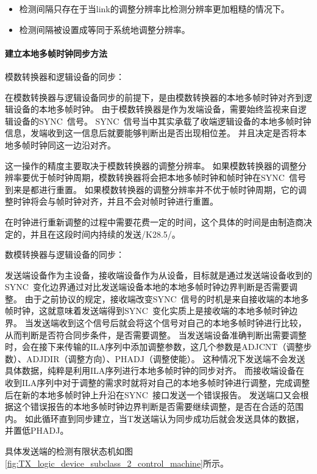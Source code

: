\documentclass[UTF8]{ctexart}
\begin{document}
\begin{itemize}
\item 检测间隔只存在于当link的调整分辨率比检测分辨率更加粗糙的情况下。
\item 检测间隔被设置成等同于系统地调整分辨率。
\end{itemize}

\paragraph{建立本地多帧时钟同步方法}

模数转换器和逻辑设备的同步：

在模数转换器与逻辑设备同步的前提下，是由模数转换器的本地多帧时钟对齐到逻辑设备的本地多帧时钟。
由于模数转换器是作为发端设备，需要始终监视来自逻辑设备的SYNC~信号。
SYNC~信号当中其实承载了收端逻辑设备的本地多帧时钟信息，发端收到这一信息后就要能够判断出是否出现相位差。
并且决定是否将本地多帧时钟同这一边沿对齐。

这一操作的精度主要取决于模数转换器的调整分辨率。
如果模数转换器的调整分辨率要优于帧时钟周期，模数转换器将会把本地多帧时钟和帧时钟在SYNC~信号到来是都进行重置。
如果模数转换器的调整分辨率并不优于帧时钟周期，它的调整时钟将会与帧时钟对齐，并且不会对帧时钟进行重置。

在时钟进行重新调整的过程中需要花费一定的时间，这个具体的时间是由制造商决定的，并且在这段时间内持续的发送/K28.5/。

数模转换器与逻辑设备的同步：

发送端设备作为主设备，接收端设备作为从设备，目标就是通过发送端设备收到的SYNC~变化边界通过对比发送端设备本地的本地多帧时钟边界判断是否需要调整。
由于之前协议的规定，接收端改变SYNC~信号的时机是来自接收端的本地多帧时钟，这就意味着发送端得到SYNC~变化实质上是接收端的本地多帧时钟边界。
当发送端收到这个信号后就会将这个信号对自己的本地多帧时钟进行比较，从而判断是否符合同步条件，是否需要调整。
当发送端设备准确判断出需要调整时，会在接下来传输的ILA序列中添加调整参数，这几个参数是ADJCNT（调整步数）、ADJDIR（调整方向）、PHADJ（调整使能）。
这种情况下发送端不会发送具体数据，纯粹是利用ILA序列进行本地多帧时钟的同步对齐。
而接收端设备在收到ILA序列中对于调整的需求时就将对自己的本地多帧时钟进行调整，完成调整后在新的本地多帧时钟上升沿在SYNC~接口发送一个错误报告。
发送端口又会根据这个错误报告的本地多帧时钟边界判断是否需要继续调整，是否在合适的范围内。
如此循环直到同步建立，当T发送端认为同步成功后就会发送具体的数据，并置低PHADJ。

具体发送端的检测有限状态机如图\ref{fig:TX_logic_device_subclass_2_control_machine}所示。
\end{document}
